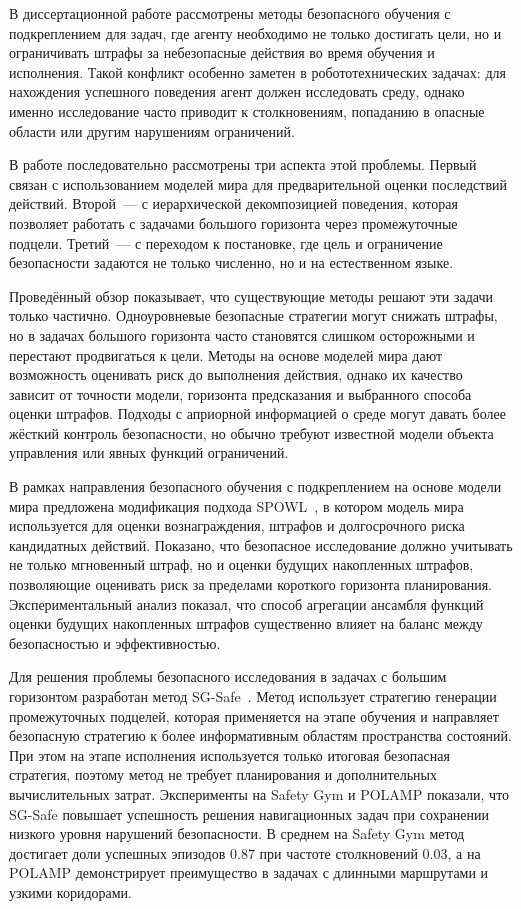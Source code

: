 В диссертационной работе рассмотрены методы безопасного обучения с подкреплением для задач, где агенту необходимо не только достигать цели, но и ограничивать штрафы за небезопасные действия во время обучения и исполнения. Такой конфликт особенно заметен в робототехнических задачах: для нахождения успешного поведения агент должен исследовать среду, однако именно исследование часто приводит к столкновениям, попаданию в опасные области или другим нарушениям ограничений.

В работе последовательно рассмотрены три аспекта этой проблемы. Первый связан с использованием моделей мира для предварительной оценки последствий действий. Второй~--- с иерархической декомпозицией поведения, которая позволяет работать с задачами большого горизонта через промежуточные подцели. Третий~--- с переходом к постановке, где цель и ограничение безопасности задаются не только численно, но и на естественном языке.

Проведённый обзор показывает, что существующие методы решают эти задачи только частично. Одноуровневые безопасные стратегии могут снижать штрафы, но в задачах большого горизонта часто становятся слишком осторожными и перестают продвигаться к цели. Методы на основе моделей мира дают возможность оценивать риск до выполнения действия, однако их качество зависит от точности модели, горизонта предсказания и выбранного способа оценки штрафов. Подходы с априорной информацией о среде могут давать более жёсткий контроль безопасности, но обычно требуют известной модели объекта управления или явных функций ограничений.

В рамках направления безопасного обучения с подкреплением на основе модели мира предложена модификация подхода SPOWL~, в котором модель мира используется для оценки вознаграждения, штрафов и долгосрочного риска кандидатных действий. Показано, что безопасное исследование должно учитывать не только мгновенный штраф, но и оценки будущих накопленных штрафов, позволяющие оценивать риск за пределами короткого горизонта планирования. Экспериментальный анализ показал, что способ агрегации ансамбля функций оценки будущих накопленных штрафов существенно влияет на баланс между безопасностью и эффективностью.

Для решения проблемы безопасного исследования в задачах с большим горизонтом разработан метод SG-Safe~. Метод использует стратегию генерации промежуточных подцелей, которая применяется на этапе обучения и направляет безопасную стратегию к более информативным областям пространства состояний. При этом на этапе исполнения используется только итоговая безопасная стратегия, поэтому метод не требует планирования и дополнительных вычислительных затрат. Эксперименты на Safety Gym и POLAMP показали, что SG-Safe повышает успешность решения навигационных задач при сохранении низкого уровня нарушений безопасности. В среднем на Safety Gym метод достигает доли успешных эпизодов $0.87$ при частоте столкновений $0.03$, а на POLAMP демонстрирует преимущество в задачах с длинными маршрутами и узкими коридорами.

